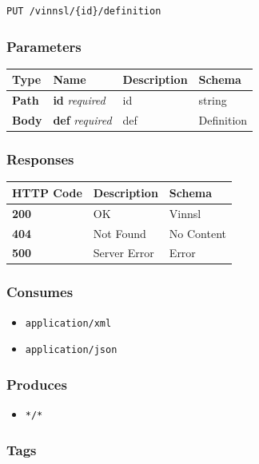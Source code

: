 \begin{verbatim}
PUT /vinnsl/{id}/definition
\end{verbatim}

\subsubsection{Parameters}\label{parameters-5}

\begin{longtable}[]{@{}llll@{}}
\toprule
Type & Name & Description & Schema\tabularnewline
\midrule
\endhead
\textbf{Path} & \textbf{id} \emph{required} & id & string\tabularnewline
\textbf{Body} & \textbf{def} \emph{required} & def &
Definition\tabularnewline
\bottomrule
\end{longtable}

\subsubsection{Responses}\label{responses-6}

\begin{longtable}[]{@{}lll@{}}
\toprule
HTTP Code & Description & Schema\tabularnewline
\midrule
\endhead
\textbf{200} & OK & Vinnsl\tabularnewline
\textbf{404} & Not Found & No Content\tabularnewline
\textbf{500} & Server Error & Error\tabularnewline
\bottomrule
\end{longtable}

\subsubsection{Consumes}\label{consumes-2}

\begin{itemize}
\tightlist
\item
  \texttt{application/xml}
\item
  \texttt{application/json}
\end{itemize}

\subsubsection{Produces}\label{produces-6}

\begin{itemize}
\tightlist
\item
  \texttt{*/*}
\end{itemize}

\subsubsection{Tags}\label{tags-6}

